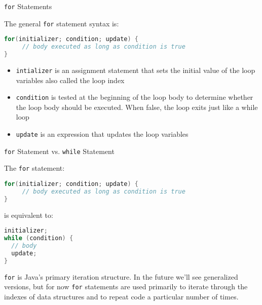 \documentclass{beamer}
\begin{document}
\begin{frame}[fragile]{{\tt for} Statements}


The general {\tt for} statement syntax is:
\begin{lstlisting}[language=Java]
for(initializer; condition; update) {
     // body executed as long as condition is true
}
\end{lstlisting}
\begin{itemize}
\item {\tt intializer} is an assignment statement that sets the initial value of the loop variables also called the loop index
\item {\tt condition} is tested at the beginning of the loop body to determine whether the loop body should be executed.  When false, the loop exits just like a while loop
\item {\tt update} is an expression that updates the loop variables
\end{itemize}

\end{frame}

\begin{frame}[fragile]{{\tt for} Statement vs. {\tt while} Statement}


The {\tt for} statement:
\begin{lstlisting}[language=Java]
for(initializer; condition; update) {
     // body executed as long as condition is true
}
\end{lstlisting}

is equivalent to:
\begin{lstlisting}[language=Java]
initializer;
while (condition) {
  // body
  update;
}
\end{lstlisting}


{\tt for} is Java's primary iteration structure.  In the future we'll see generalized versions, but for now {\tt for} statements are used primarily to iterate through the indexes of data structures and to repeat code a particular number of times.


\end{frame}
\end{document}
